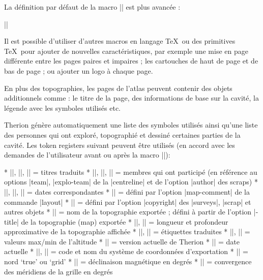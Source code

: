 La d\'efinition par d\'efaut de la macro |\dopage| est plus avanc\'ee :

|\def\dopage{%
 \vbox{\centerline{\framed{\mapbox}}
  \bigskip
  \line{%
    \vbox to \ht\navbox{
      \hbox{\size[20]\the\pagelabel
        \ifpagenumbering\space(\the\pagenum)\fi
        \space\size[16]\the\pagename}
      \ifpagenumbering
        \medskip
        \hbox{\qquad\qquad
          \vtop{%
            \hbox to 0pt{\hss\showpointer\pointerN\hss}
            \hbox to 0pt{\llap{\showpointer\pointerW\hskip0.7em}%
              \raise1pt\hbox to 0pt{\hss$\updownarrow$\hss}%
              \raise1pt\hbox to 0pt{\hss$\leftrightarrow$\hss}%
              \rlap{\hskip0.7em\showpointer\pointerE}}
              \hbox to 0pt{\hss\showpointer\pointerS\hss}
          }\qquad\qquad
          \vtop{
            \def\arr{$\uparrow$}
            \showpointerlist\pointerU
            \def\arr{$\downarrow$}
            \showpointerlist\pointerD
          }
        }
      \fi
      \vss
      \scalebar
    }\hss
    \box\navbox
  }
 }
}|

Il est possible d'utiliser d'autres macros en langage \TeX\ ou des primitives \TeX\ pour ajouter de nouvelles caract\'eristiques, 
par exemple une mise en page diff\'erente entre les pages paires et impaires ; les cartouches de haut de page et de bas de page ;
ou ajouter un logo \`a chaque page. 

En plus des topographies, les pages de l'atlas peuvent contenir des objets additionnels comme :
le titre de la page, des informations de base sur la cavit\'e, la l\'egende avec les symboles utilis\'es etc.

Therion g\'en\`ere automatiquement une liste des symboles utilis\'es ainsi qu'une liste des personnes qui ont explor\'e, topographi\'e et dessin\'e 
certaines parties de la cavit\'e.
Les token registers suivant peuvent \^etre utilis\'es (en accord avec les demandes de l'utilisateur 
avant ou apr\`es la macro |\insertmaps|):

\list
* |\explotitle|, |\topotitle|, |\cartotitle| = titres traduits
* |\exploteam|, |\topoteam|, |\cartoteam| = membres qui ont particip\'e (en r\'ef\'erence au options |team|, |explo-team| de la |centreline| et de l'option |author| des scraps)
* |\explodate|, |\topodate|, |\cartodate| = dates correspondantes
* |\comment| = d\'efini par l'option |map-comment| de la commande |layout|
* |\copyrights| = d\'efini par l'option |copyright| des |surveys|, |scrap| et autres objets
* |\cavename| = nom de la topographie export\'ee ; d\'efini \`a partir de l'option |-title| de la topographie (map) export\'ee
* |\cavelength|, |\cavedepth| = longueur et profondeur approximative de la topographie affich\'ee
* |\cavelengthtitle|, |\cavedepthtitle| = \'etiquettes traduites
* |\cavemaxz|, |\caveminz| = valeurs max/min de l'altitude
* |\thversion| = version actuelle de Therion
* |\currentdate| = date actuelle
* |\outcscode|, |\outcsname| = code et nom du syst\`eme de coordonn\'ees d'exportation
* |\northdir| = nord `true' ou `grid'
* |\magdecl| = d\'eclinaison magn\'etique en degr\'es
* |\gridconv| = convergence des m\'eridiens de la grille en degr\'es
\endlist

